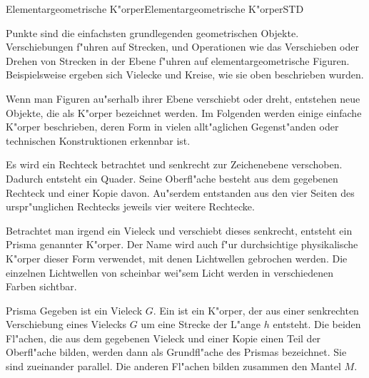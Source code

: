 \begin{MXContent}{Elementargeometrische K"orper}{Elementargeometrische K"orper}{STD}%

Punkte sind die einfachsten grundlegenden geometrischen Objekte. Verschiebungen
f"uhren auf Strecken, und Operationen wie das Verschieben oder Drehen von 
Strecken in der Ebene f"uhren auf elementargeometrische Figuren. 
Beispielsweise ergeben sich Vielecke und Kreise, wie sie oben beschrieben 
wurden.

Wenn man Figuren au"serhalb ihrer Ebene verschiebt oder dreht, entstehen neue
Objekte, die als K"orper bezeichnet werden. Im Folgenden werden einige einfache 
K"orper beschrieben, deren Form in vielen allt"aglichen Gegenst"anden oder 
technischen Konstruktionen erkennbar ist.

\begin{MExample}
Es wird ein Rechteck betrachtet und senkrecht zur Zeichenebene verschoben.
Dadurch entsteht ein Quader. Seine Oberfl"ache besteht aus dem gegebenen
Rechteck und einer Kopie davon. Au"serdem entstanden aus den vier Seiten
des urspr"unglichen Rechtecks jeweils vier weitere Rechtecke.
\end{MExample}

Betrachtet man irgend ein Vieleck und verschiebt dieses senkrecht, entsteht
ein Prisma genannter K"orper. Der Name wird auch f"ur durchsichtige physikalische
K"orper dieser Form verwendet, mit denen Lichtwellen gebrochen werden. Die 
einzelnen Lichtwellen von scheinbar wei"sem Licht werden in verschiedenen Farben
sichtbar.

\begin{MXInfo}{Prisma}
Gegeben ist ein Vieleck $G$.
Ein  ist ein K"orper, der aus einer senkrechten 
Verschiebung eines Vielecks $G$ um eine Strecke der L"ange $h$ entsteht. 
Die beiden Fl"achen, die aus dem gegebenen Vieleck und einer Kopie einen 
Teil der Oberfl"ache bilden, werden dann als Grundfl"ache des Prismas 
bezeichnet. Sie sind zueinander parallel. 
Die anderen Fl"achen bilden zusammen den Mantel $M$.


\end{MXInfo}
\end{MXContent}
